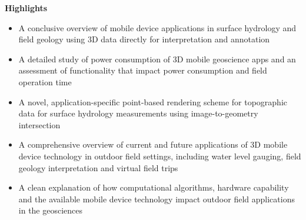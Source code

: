 \documentclass[review]{elsarticle}
\begin{document}
\newpage
\textbf{Highlights} \\
\begin{itemize}
\item A conclusive overview of mobile device applications in surface hydrology and field geology using 3D data directly for interpretation and annotation
\item A detailed study of power consumption of 3D mobile geoscience apps and an assessment of functionality that impact power consumption and field operation time
\item A novel, application-specific point-based rendering scheme for topographic data for surface hydrology measurements using image-to-geometry intersection
\item A comprehensive overview of current and future applications of 3D mobile device technology in outdoor field settings, including water level gauging, field geology interpretation and virtual field trips
\item A clean explanation of how computational algorithms, hardware capability and the available mobile device technology impact outdoor field applications in the geosciences
\end{itemize}
\end{document}
